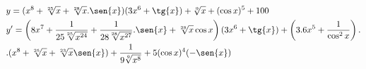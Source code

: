 \begin{ex}
\begin{align}
&y=(x^8+\sqrt[25]{x}+\sqrt[28]{x}.\sen{x})(3x^6+\tg{x})+\sqrt[9]{x}+(\cos{x})^5+100\nonumber\\
&y'=\left(8x^7+\frac{1}{25\sqrt[25]{x^{24}}}+\frac{1}{28\sqrt[28]{x^{27}}}.\sen{x}+\sqrt[28]{x}\cos{x}\right)(3x^6+\tg{x})+\left(3.6x^5+\frac{1}{\cos^2{x}}\right).\nonumber\\
&.(x^8+\sqrt[25]{x}+\sqrt[23]{x}\sen{x})+\frac{1}{9\sqrt[9]{x^8}}+5(\cos{x})^4(-\sen{x})\nonumber
\end{align}
\end{ex}